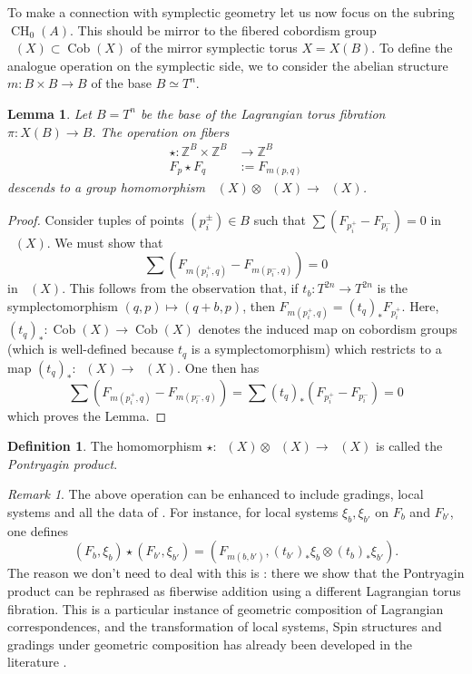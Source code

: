 \documentclass[10pt]{amsart}
\newtheorem{lem}[thm]{Lemma}
\theoremstyle{definition}
\newtheorem{defn}[thm]{Definition}
\theoremstyle{remark}
\newtheorem{rmk}[thm]{Remark}
\def\Z{\mathbb{Z}}
\DeclareMathOperator{\Cob}{Cob}
\DeclareMathOperator{\Cobfib}{\mathrm{Cob}_{\mathrm{fib}}}
\DeclareMathOperator{\CH}{CH}
\def\x{\times}
\begin{document}
To make a connection with symplectic geometry let us now focus on the subring $\CH_0(A)$.
This should be mirror to the fibered cobordism group $\Cobfib(X)\subset \Cob(X)$ of the  mirror symplectic torus $X = X(B)$.
To define the analogue operation on the symplectic side,  we to consider the abelian structure $m:B \x B \to B$ of the base $B \simeq T^n$.

\begin{lem}\label{lem:pontryagin_on_cob}
    Let $B = T^n$ be the base of the Lagrangian torus fibration $\pi: X(B)\to B$.
    The operation on fibers
    \begin{align*}
        \star:\Z^B \x \Z^B &\to \Z^B\\
        F_p \star F_q &:= F_{m(p,q)}
    \end{align*}
    descends to a group homomorphism $\Cobfib(X) \otimes \Cobfib(X) \to \Cobfib(X)$.
\end{lem}
\begin{proof}
    Consider tuples of points $(p_i^\pm) \in B$ such that $\sum (F_{p_i^+} - F_{p_i^-}) = 0$ in $\Cobfib(X)$.
    We must show that 
    $$
        \sum (F_{m(p_i^+,q)} - F_{m(p_i^-,q)}) = 0
    $$
    in $\Cobfib(X)$.
    This follows from the observation that, if $t_b: T^{2n} \to T^{2n}$ is the symplectomorphism $(q,p) \mapsto (q+b,p)$, then  $F_{m(p_i^+,q)} = (t_q)_* F_{p_i^+}$. 
    Here, $(t_q)_*: \Cob(X) \to \Cob(X)$ denotes the induced map on cobordism groups (which is well-defined because $t_q$ is a symplectomorphism) which restricts to a map $(t_q)_*: \Cobfib(X) \to \Cobfib(X)$.
    One then has 
    $$
    \sum (F_{m(p_i^+,q)} - F_{m(p_i^-,q)}) = \sum (t_q)_* (F_{p_i^+} - F_{p_i^-}) = 0
    $$
    which proves the Lemma.
\end{proof}

\begin{defn}
    The homomorphism $\star: \Cobfib(X) \otimes \Cobfib(X) \to \Cobfib(X)$ is called the \emph{Pontryagin product}.
\end{defn}

\begin{rmk}
    The above operation can be enhanced to include gradings, local systems and all the data of .
    For instance, for local systems $\xi_{b}, \xi_{b'}$ on  $F_b$ and $F_{b'}$, one defines 
    $$
        (F_b, \xi_b) \star (F_{b'}, \xi_{b'}) = (F_{m(b,b')}, (t_{b'})_* \xi_b \otimes (t_{b})_*\xi_{b'}).
    $$
    The reason we don't need to deal with this is : there we show that the Pontryagin product can be rephrased as fiberwise addition using a different Lagrangian torus fibration.
    This is a particular instance of geometric composition of Lagrangian correspondences, and the transformation of local systems, Spin structures and gradings under geometric composition has already been developed in the literature \cite{wehrheim2010quilted,subotic,wehrheim2015orientations}.
\end{rmk}
\end{document}
